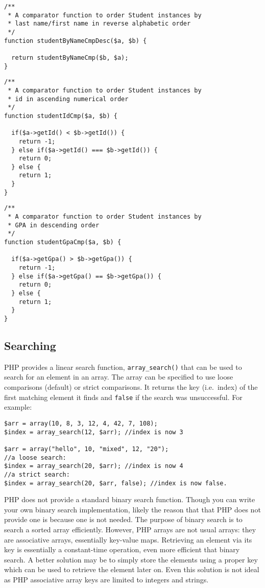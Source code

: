 \begin{verbatim}
/**
 * A comparator function to order Student instances by 
 * last name/first name in reverse alphabetic order
 */
function studentByNameCmpDesc($a, $b) {

  return studentByNameCmp($b, $a);
}
\end{verbatim}

\begin{verbatim}
/**
 * A comparator function to order Student instances by 
 * id in ascending numerical order
 */
function studentIdCmp($a, $b) {

  if($a->getId() < $b->getId()) {
    return -1;
  } else if($a->getId() === $b->getId()) {
    return 0;
  } else {
    return 1;
  }
}
\end{verbatim}

\begin{verbatim}
/**
 * A comparator function to order Student instances by 
 * GPA in descending order
 */
function studentGpaCmp($a, $b) {

  if($a->getGpa() > $b->getGpa()) {
    return -1;
  } else if($a->getGpa() == $b->getGpa()) {
    return 0;
  } else {
    return 1;
  }
}
\end{verbatim}

\subsection{Searching}

PHP provides a linear search function, \texttt{array_search()} that
can be used to search for an element in an array.  The array can be specified
to use loose comparisons (default) or strict comparisons.  It returns the
key (i.e.\ index) of the first matching element it finds and 
\texttt{false} if the search was unsuccessful.  For example:

\begin{verbatim}
$arr = array(10, 8, 3, 12, 4, 42, 7, 108);
$index = array_search(12, $arr); //index is now 3

$arr = array("hello", 10, "mixed", 12, "20");
//a loose search:
$index = array_search(20, $arr); //index is now 4
//a strict search:
$index = array_search(20, $arr, false); //index is now false.
\end{verbatim}

PHP does not provide a standard binary search function.  Though you can
write your own binary search implementation, likely the reason that that
PHP does not provide one is because one is not needed.  The purpose of
binary search is to search a sorted array efficiently.  However, PHP
arrays are not usual arrays: they are associative arrays, essentially
key-value maps.  Retrieving an element via its key is essentially a 
constant-time operation, even more efficient that binary search.  A better
solution may be to simply store the elements using a proper key which
can be used to retrieve the element later on.  Even this solution is 
not ideal as PHP associative array keys are limited to integers and
strings.  

